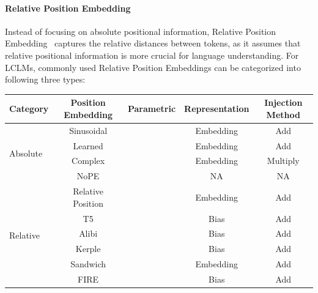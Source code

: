 \documentclass[11pt, a4paper, logo, copyright, nonumbering]{map}
\newcommand{\Checkmark}{\ding{51}} %
\newcommand{\XSolidBrush}{\ding{55}} %
\begin{document}
\paragraph{Relative Position Embedding} Instead of focusing on absolute positional information, Relative Position Embedding~\citep{shaw2018self} captures the relative distances between tokens, as it assumes that relative positional information is more crucial for language understanding. For LCLMs, commonly used Relative Position Embeddings can be categorized into following three types:
\begin{table}[t!]
\centering
\footnotesize
\renewcommand{\arraystretch}{1.1}
\begin{tabular}{lcccc}
\toprule
\bf Category                    & \bf Position Embedding                          & \bf Parametric & \bf Representation & \bf Injection Method \\ \midrule
\multirow{4}{*}{Absolute}      & Sinusoidal \cite{vaswani2017attention}         & \XSolidBrush      & Embedding         & Add                 \\
                               & Learned \cite{gehring2017convolutional}        & \Checkmark      & Embedding         & Add                 \\
                               & Complex \cite{wang2019encoding}                & \Checkmark      & Embedding         & Multiply            \\
                               & NoPE \cite{chi2023latent,kazemnejad2024impact} & \XSolidBrush      & NA                & NA                  \\ \midrule
\multirow{9}{*}{Relative}      & Relative Position \cite{shaw2018self}          & \Checkmark      & Embedding         & Add                 \\
                               & T5 \cite{raffel2020exploring}                  & \Checkmark      & Bias              & Add                 \\
                               & Alibi \cite{press2021train}                    & \XSolidBrush      & Bias              & Add                 \\
                               & Kerple \cite{chi2022kerple}                    & \Checkmark      & Bias              & Add                 \\
                               & Sandwich \cite{chi2022dissecting}              & \XSolidBrush      & Embedding         & Add                 \\
                               & FIRE \cite{li2023functional}                   & \Checkmark      & Bias              & Add                 \\

\end{tabular}
\end{table}
\end{document}
